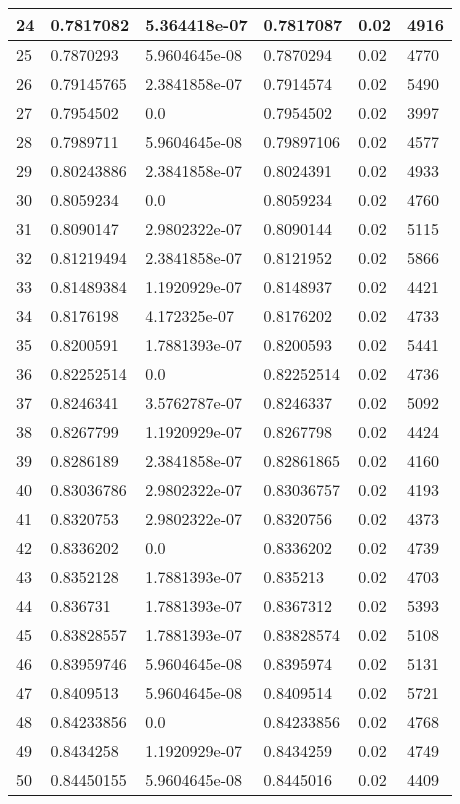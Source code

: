 \begin{longtable}{|l|l|l|l|l|l|}
24 & 0.7817082 & 5.364418e-07 & 0.7817087 & 0.02 & 4916 \\ \hline 
25 & 0.7870293 & 5.9604645e-08 & 0.7870294 & 0.02 & 4770 \\ \hline 
26 & 0.79145765 & 2.3841858e-07 & 0.7914574 & 0.02 & 5490 \\ \hline 
27 & 0.7954502 & 0.0 & 0.7954502 & 0.02 & 3997 \\ \hline 
28 & 0.7989711 & 5.9604645e-08 & 0.79897106 & 0.02 & 4577 \\ \hline 
29 & 0.80243886 & 2.3841858e-07 & 0.8024391 & 0.02 & 4933 \\ \hline 
30 & 0.8059234 & 0.0 & 0.8059234 & 0.02 & 4760 \\ \hline 
31 & 0.8090147 & 2.9802322e-07 & 0.8090144 & 0.02 & 5115 \\ \hline 
32 & 0.81219494 & 2.3841858e-07 & 0.8121952 & 0.02 & 5866 \\ \hline 
33 & 0.81489384 & 1.1920929e-07 & 0.8148937 & 0.02 & 4421 \\ \hline 
34 & 0.8176198 & 4.172325e-07 & 0.8176202 & 0.02 & 4733 \\ \hline 
35 & 0.8200591 & 1.7881393e-07 & 0.8200593 & 0.02 & 5441 \\ \hline 
36 & 0.82252514 & 0.0 & 0.82252514 & 0.02 & 4736 \\ \hline 
37 & 0.8246341 & 3.5762787e-07 & 0.8246337 & 0.02 & 5092 \\ \hline 
38 & 0.8267799 & 1.1920929e-07 & 0.8267798 & 0.02 & 4424 \\ \hline 
39 & 0.8286189 & 2.3841858e-07 & 0.82861865 & 0.02 & 4160 \\ \hline 
40 & 0.83036786 & 2.9802322e-07 & 0.83036757 & 0.02 & 4193 \\ \hline 
41 & 0.8320753 & 2.9802322e-07 & 0.8320756 & 0.02 & 4373 \\ \hline 
42 & 0.8336202 & 0.0 & 0.8336202 & 0.02 & 4739 \\ \hline 
43 & 0.8352128 & 1.7881393e-07 & 0.835213 & 0.02 & 4703 \\ \hline 
44 & 0.836731 & 1.7881393e-07 & 0.8367312 & 0.02 & 5393 \\ \hline 
45 & 0.83828557 & 1.7881393e-07 & 0.83828574 & 0.02 & 5108 \\ \hline 
46 & 0.83959746 & 5.9604645e-08 & 0.8395974 & 0.02 & 5131 \\ \hline 
47 & 0.8409513 & 5.9604645e-08 & 0.8409514 & 0.02 & 5721 \\ \hline 
48 & 0.84233856 & 0.0 & 0.84233856 & 0.02 & 4768 \\ \hline 
49 & 0.8434258 & 1.1920929e-07 & 0.8434259 & 0.02 & 4749 \\ \hline 
50 & 0.84450155 & 5.9604645e-08 & 0.8445016 & 0.02 & 4409 \\ \hline 
\end{longtable}